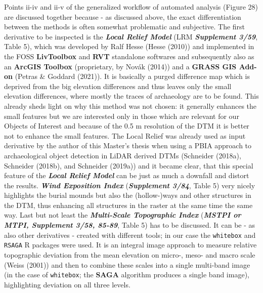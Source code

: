 \documentclass[
  12pt,
]{article}
\begin{document}
Points ii-iv and ii-v of the generalized workflow of automated analysis (Figure 28) are discussed together because - as discussed above, the exact differentiation between the methods is often somewhat problematic and subjective.
The first derivative to be inspected is the \textbf{\emph{Local Relief Model}} (LRM \textbf{\emph{Supplement 3/59}}, Table 5), which was developed by Ralf Hesse (Hesse (2010)) and implemented in the FOSS \textbf{LivToolbox} and \textbf{RVT} standalone softwares and subsequently also as an \textbf{ArcGIS Toolbox} (proprietary, by Novák (2014)) and a \textbf{GRASS GIS Add-on} (Petras \& Goddard (2021)). It is basically a purged difference map which is deprived from the big elevation differences and thus leaves only the small elevation differences, where mostly the traces of archaeology are to be found. This already sheds light on why this method was not chosen: it generally enhances the small features but we are interested only in those which are relevant for our Objects of Interest and because of the 0.5 m resolution of the DTM it is better not to enhance the small features. The Local Relief was already used as input derivative by the author of this Master's thesis when using a PBIA approach to archaeological object detection in LiDAR derived DTMs (Schneider (2018a), Schneider (2018b), and Schneider (2019a)) and it became clear, that this special feature of the \textbf{\emph{Local Relief Model}} can be just as much a downfall and distort the results.
\textbf{\emph{Wind Exposition Index}} (\textbf{\emph{Supplement 3/84}}, Table 5) very nicely highlights the burial mounds but also the (hollow-)ways and other structures in the DTM, thus enhancing all structures in the raster at the same time the same way.
Last but not least the \textbf{\emph{Multi-Scale Topographic Index}} (\textbf{\emph{MSTPI or MTPI, Supplement 3/58, 85-89}}, Table 5) has to be discussed. It can be - as also other derivatives - created with different tools; in our case the \texttt{whitebox} and \texttt{RSAGA} R packages were used. It is an integral image approach to measure relative topographic deviation from the mean elevation on micro-, meso- and macro scale (Weiss (2001)) and then to combine these scales into a single multi-band image (in the case of \texttt{whitebox}; the \textbf{SAGA} algorithm produces a single band image), highlighting deviation on all three levels.
\end{document}
